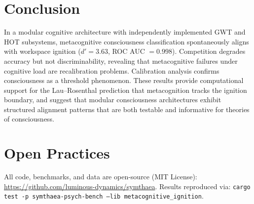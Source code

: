 \documentclass[10pt,letterpaper]{article}
\newcommand{\dprime}{d'}
\begin{document}
\section{Conclusion}

In a modular cognitive architecture with independently implemented GWT
and HOT subsystems, metacognitive consciousness classification
spontaneously aligns with workspace ignition ($\dprime = 3.63$,
ROC AUC $= 0.998$).  Competition degrades accuracy but not
discriminability, revealing that metacognitive failures under cognitive
load are recalibration problems.  Calibration analysis confirms
consciousness as a threshold phenomenon.  These results provide
computational support for the Lau--Rosenthal prediction that
metacognition tracks the ignition boundary, and suggest that modular
consciousness architectures exhibit structured alignment patterns
that are both testable and informative for theories of consciousness.


\section*{Open Practices}

All code, benchmarks, and data are open-source (MIT License):
\url{https://github.com/luminous-dynamics/symthaea}.
Results reproduced via: \texttt{cargo test -p symthaea-psych-bench --lib metacognitive\_ignition}.




\end{document}
